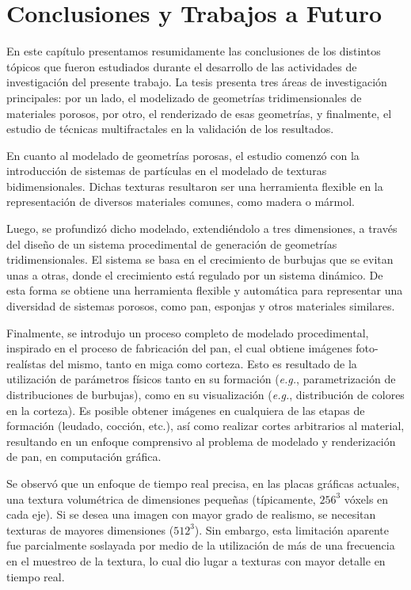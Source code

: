 \chapter{Conclusiones y Trabajos a Futuro}
En este capítulo presentamos resumidamente las conclusiones de los distintos tópicos que fueron estudiados durante el desarrollo de las actividades de investigación del presente trabajo.
La tesis presenta tres áreas de investigación principales: por un lado, el modelizado de geometrías tridimensionales de materiales porosos, por otro, el renderizado de esas geometrías, y finalmente, el estudio de técnicas multifractales en la validación de los resultados.

En cuanto al modelado de geometrías porosas, el estudio comenzó con la introducción de sistemas de partículas en el modelado de texturas bidimensionales.
Dichas texturas resultaron ser una herramienta flexible en la representación de diversos materiales comunes, como madera o mármol.

Luego, se profundizó dicho modelado, extendiéndolo a tres dimensiones, a través del diseño de un sistema procedimental de generación de geometrías tridimensionales.
El sistema se basa en el crecimiento de burbujas que se evitan unas a otras, donde el crecimiento está regulado por un sistema dinámico.
De esta forma se obtiene una herramienta flexible y automática para representar una diversidad de sistemas porosos, como pan, esponjas y otros materiales similares.

Finalmente, se introdujo un proceso completo de modelado procedimental, inspirado en el proceso de fabricación del pan, el cual obtiene imágenes foto-realístas del mismo, tanto en miga como corteza.
Esto es resultado de la utilización de parámetros físicos tanto en su formación ({\em e.g.}, parametrización de distribuciones de burbujas), como en su visualización ({\em e.g.}, distribución de colores en la corteza).
Es posible obtener imágenes en cualquiera de las etapas de formación (leudado, cocción, etc.), así como realizar cortes arbitrarios al material, resultando en un enfoque comprensivo al problema de modelado y renderización de pan, en computación gráfica.

Se observó que un enfoque de tiempo real precisa, en las placas gráficas actuales, una textura volumétrica de dimensiones pequeñas (típicamente, $256^{3}$ vóxels en cada eje).
Si se desea una imagen con mayor grado de realismo, se necesitan texturas de mayores dimensiones ($512^{3}$).
Sin embargo, esta limitación aparente fue parcialmente soslayada por medio de la utilización de más de una frecuencia en el muestreo de la textura, lo cual dio lugar a texturas con mayor detalle en tiempo real.

